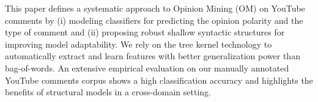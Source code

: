 This paper defines a systematic approach to Opinion Mining (OM) on YouTube comments by (i) modeling classifiers for predicting the opinion polarity and the type of comment and (ii) proposing robust shallow syntactic structures for improving model adaptability. We rely on the tree kernel technology to automatically extract and learn features with better generalization power than bag-of-words. An extensive empirical evaluation on our manually annotated YouTube comments corpus shows a high classification accuracy and highlights the benefits of structural models in a cross-domain setting.
